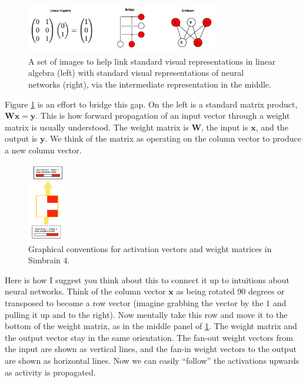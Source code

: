 \begin{figure}[h]
\centering
\includegraphics[width=0.75\textwidth]{images/LinalgToSimbrainReps.png}
\caption[Jeff Yoshimi.]{A set of images to help link standard visual representations in linear algebra (left) with standard visual representations of neural networks (right), via the intermediate representation in the middle. }
\label{linalgToSimbrain}
\end{figure}

Figure \ref{linalgToSimbrain} is an effort to bridge this gap. On the left is a standard matrix product, $\mathbf{W} \mathbf{x} = \mathbf{y}$. This is how forward propagation of an input vector through a weight matrix is usually understood. The weight matrix is $\mathbf{W}$, the input is $\mathbf{x}$, and the output is $\mathbf{y}$. We think of the matrix as operating on the column vector to produce a new column vector.  

\begin{figure}[h]
\centering
\includegraphics[width=0.15\textwidth]{images/simbrain4_ff_2_3.png}
\caption[Jeff Yoshimi.]{Graphical conventions for activation vectors and weight matrices in Simbrain 4. }
\label{simbrain4_ff23}
\end{figure}
Here is how I suggest you think about this to connect it up to intuitions about neural networks. Think of the column vector $\mathbf{x}$ as being rotated 90 degrees or transposed to become a row vector (imagine grabbing the vector by the $1$ and pulling it up and to the right). Now mentally take this row and move it to the bottom of the weight matrix, as in the middle panel of  \ref{linalgToSimbrain}. The weight matrix and the output vector stay in the same orientation. The fan-out weight vectors from the input are shown as vertical lines, and the fan-in weight vectors to the output are shown as horizontal lines. Now we can easily ``follow'' the activations upwards as activity is propagated. 

